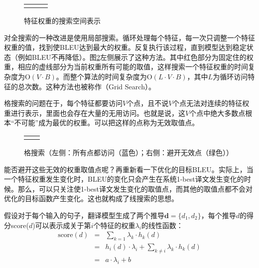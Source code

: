 \begin{figure}[htp]
\centering
\begin{tabular}{l l l}
& \subfigure{} \subfigure{} \subfigure{} &  \\
\end{tabular}
\caption{特征权重的搜索空间表示}
\label{fig:4-23}
\end{figure}

\parinterval 对全搜索的一种改进是使用局部搜索。循环处理每个特征，每一次只调整一个特征权重的值，找到使BLEU达到最大的权重。反复执行该过程，直到模型达到稳定状态（例如BLEU不再降低）。图\ref{fig:4-24}左侧展示了这种方法。其中红色部分为固定住的权重，相应的虚线部分为当前权重所有可能的取值，这样搜索一个特征权重的时间复杂度为$\textrm{O}(V \cdot B)$。而整个算法的时间复杂度为$\textrm{O}(L \cdot V \cdot B)$，其中$L$为循环访问特征的总次数。这种方法也被称作{\small{}}（Grid Search）。

\parinterval 格搜索的问题在于，每个特征都要访问$V$个点，且不说$V$个点无法对连续的特征权重进行表示，里面也会存在大量的无用访问。也就是说，这$V$个点中绝大多数点根本``不可能''成为最优的权重。可以把这样的点称为无效取值点。

\begin{figure}[htp]
\centering
\begin{tabular}{l l}
\subfigure{} &  \subfigure{} \\
\end{tabular}
\caption{格搜索（左侧：所有点都访问（蓝色）；右侧：避开无效点（绿色））}
\label{fig:4-24}
\end{figure}

\parinterval 能否避开这些无效的权重取值点呢？再重新看一下优化的目标BLEU。实际上，当一个特征权重发生变化时，BLEU的变化只会产生在系统1-best译文发生变化的时候。那么，可以只关注使1-best译文发生变化的取值点，而其他的取值点都不会对优化的目标函数产生变化。这也就构成了线搜索的思想。

\parinterval 假设对于每个输入的句子，翻译模型生成了两个推导$\mathbf{d} = \{d_1,d_2\}$，每个推导$d$的得分score($d$)可以表示成关于第$i$个特征的权重$\lambda_i$的线性函数：
\begin{eqnarray}
\textrm{score}(d) &=& \sum_{k=1} \lambda_k \cdot h_k (d) \nonumber \\
&=& h_i (d) \cdot \lambda_i + \sum_{k \neq i} \lambda_k \cdot h_k (d) \nonumber \\
&=& a \cdot \lambda_i + b
\label{eq:4-20}
\end{eqnarray}

